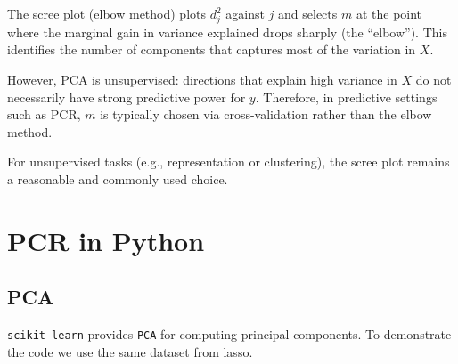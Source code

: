 \documentclass[
  letterpaper,
  DIV=11,
  numbers=noendperiod]{scrreprt}
\theoremstyle{definition}
\theoremstyle{definition}
\theoremstyle{plain}
\theoremstyle{plain}
\theoremstyle{remark}
\begin{document}
\begin{tcolorbox}[enhanced jigsaw, arc=.35mm, bottomrule=.15mm, bottomtitle=1mm, breakable, colback=white, colbacktitle=quarto-callout-note-color!10!white, colframe=quarto-callout-note-color-frame, coltitle=black, left=2mm, leftrule=.75mm, opacityback=0, opacitybacktitle=0.6, rightrule=.15mm, title=\textcolor{quarto-callout-note-color}{\faInfo}\hspace{0.5em}{Scree plot (Elbow method)}, titlerule=0mm, toprule=.15mm, toptitle=1mm]

The scree plot (elbow method) plots \(d_j^2\) against \(j\) and selects
\(m\) at the point where the marginal gain in variance explained drops
sharply (the ``elbow''). This identifies the number of components that
captures most of the variation in \(X\).

However, PCA is unsupervised: directions that explain high variance in
\(X\) do not necessarily have strong predictive power for \(y\).
Therefore, in predictive settings such as PCR, \(m\) is typically chosen
via cross-validation rather than the elbow method.

For unsupervised tasks (e.g., representation or clustering), the scree
plot remains a reasonable and commonly used choice.

\end{tcolorbox}

\section{PCR in Python}\label{pcr-in-python}

\subsection{PCA}\label{pca}

\texttt{scikit-learn} provides \texttt{PCA} for computing principal
components. To demonstrate the code we use the same dataset from lasso.
\end{document}
